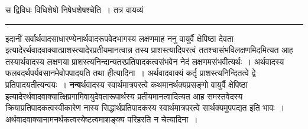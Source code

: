 \documentclass[11pt, openany]{book}
\begin{document}
{\bl स द्विविधः {\al विधिशेषो निषेधशेषश्चेति}~। तत्र {\qtl वायव्यं }}\\
\hrule
\vspace{3mm}
\noindent
 इदानीं सर्वार्थवादसाधारण्येनार्थवादरूपवेदभागस्य लक्षणमाह {\br ननु} {\qt वायुर्वै क्षेपिष्ठा देवता}
इत्यादेरर्थवादवाक्यात्प्राशस्त्यादेरप्रतीयमानत्वान्न तस्य प्राशस्त्यादिपरत्वं ततश्चासंभविलक्षणमिदमित्यत आह तस्यार्थवादस्य लक्षणया प्राशस्त्यनिन्दान्यतरप्रतिपादकत्वसंभवेन नेदं लक्षणमसंभवीत्यर्थः~। अर्थवादस्य फलवदर्थपर्यवसानमेवोपपादयति {\br तथा हीत्यादिना~।}  अर्थवादवाक्यं कर्तृ प्राशस्त्यनिन्दितत्वे द्वे प्रतिपादयतीत्यन्वयः~। \textbf{नन्व}र्थवादस्य  स्वार्थमात्रपरत्वे कथमानर्थक्यप्रसङ्गो {\qt वायुर्वै क्षेपिष्ठा} इत्यादेरर्थवादवाक्यात्क्षिप्रगामिवायुदेवतारूपार्थस्य प्रतीयमानत्वादित्यत आह समस्तवेदस्य क्रियाप्रतिपादकत्वस्वीकारेण नास्य सिद्धार्थप्रतिपादकस्य स्वार्थमात्रपरत्वे सार्थक्यमुपपद्यत इति भावः~।अर्थवादवाक्यानामनर्थकत्वस्येष्टत्वमाशङ्क्य परिहरति {\br न चेत्यादिना~।} \\
\end{document}

